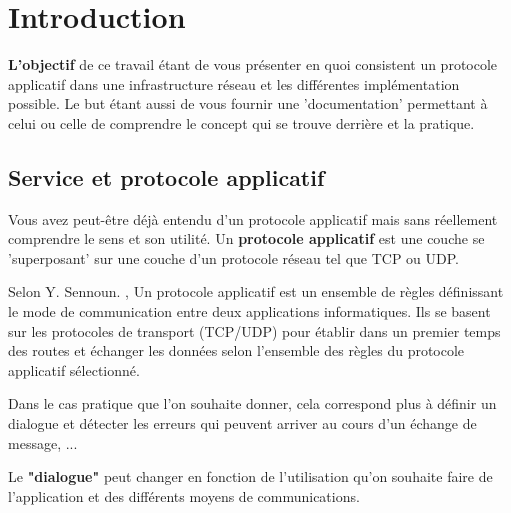\chapter{Introduction}
\label{ch:into} %


\textbf{L'objectif} de ce travail étant de vous présenter en quoi consistent un protocole applicatif dans une infrastructure réseau et les différentes implémentation possible.
Le but étant aussi de vous fournir une 'documentation' permettant à celui ou celle de comprendre le concept qui se trouve derrière et la pratique.
\\

\section{Service et protocole applicatif}

Vous avez peut-être déjà entendu d'un protocole applicatif mais sans réellement comprendre le sens et son utilité.
Un \textbf{protocole applicatif} est une couche se 'superposant' sur une couche d'un protocole réseau tel que TCP ou UDP.

\begin{definition}
  Selon Y. Sennoun. \cite{def_protocol_app}, Un protocole applicatif est un ensemble de règles définissant le mode de communication entre deux applications informatiques. Ils se basent sur les protocoles de transport (TCP/UDP) pour établir dans un premier temps des routes et échanger les données selon l’ensemble des règles du protocole applicatif sélectionné.
\end{definition}

Dans le cas pratique que l'on souhaite donner, cela correspond plus à définir un dialogue et détecter les erreurs qui peuvent arriver au cours d'un échange de message, ...

Le \textbf{"dialogue"} peut changer en fonction de l'utilisation qu'on souhaite faire de l'application et des différents moyens de communications.


